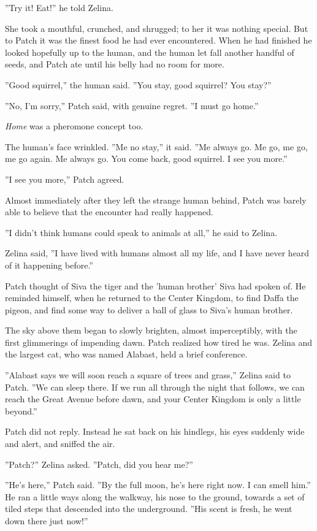 \documentclass[12pt]{book}
\begin{document}
''Try it! Eat!'' he told Zelina.

She took a mouthful, crunched, and shrugged; to her it was nothing special. But to Patch it was the finest food he had ever encountered. When he had finished he looked hopefully up to the human, and the human let fall another handful of seeds, and Patch ate until his belly had no room for more.

''Good squirrel,'' the human said. ''You stay, good squirrel? You stay?''

''No, I'm sorry,'' Patch said, with genuine regret. ''I must go home.''

{\it Home} was a pheromone concept too.

The human's face wrinkled. ''Me no stay,'' it said. ''Me always go. Me go, me go, me go again. Me always go. You come back, good squirrel. I see you more.''

''I see you more,'' Patch agreed.

Almost immediately after they left the strange human behind, Patch was barely able to believe that the encounter had really happened.

''I didn't think humans could speak to animals at all,'' he said to Zelina.

Zelina said, ''I have lived with humans almost all my life, and I have never heard of it happening before.''

Patch thought of Siva the tiger and the 'human brother' Siva had spoken of. He reminded himself, when he returned to the Center Kingdom, to find Daffa the pigeon, and find some way to deliver a ball of glass to Siva's human brother.

The sky above them began to slowly brighten, almost imperceptibly, with the first glimmerings of impending dawn. Patch realized how tired he was. Zelina and the largest cat, who was named Alabast, held a brief conference.

''Alabast says we will soon reach a square of trees and grass,'' Zelina said to Patch. ''We can sleep there. If we run all through the night that follows, we can reach the Great Avenue before dawn, and your Center Kingdom is only a little beyond.''

Patch did not reply. Instead he sat back on his hindlegs, his eyes suddenly wide and alert, and sniffed the air.

''Patch?'' Zelina asked. ''Patch, did you hear me?''

''He's here,'' Patch said. ''By the full moon, he's here right now. I can smell him.'' He ran a little ways along the walkway, his nose to the ground, towards a set of tiled steps that descended into the underground. ''His scent is fresh, he went down there just now!''
\end{document}
